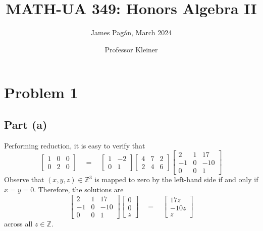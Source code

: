 \documentclass[11pt]{article}
\title{MATH-UA 349: Honors Algebra II}
\author{James Pagán, March 2024}
\date{Professor Kleiner}
\begin{document}
\maketitle
\tableofcontents
\newpage


\section{Problem 1}


\subsection{Part (a)}

Performing reduction, it is easy to verify that
\[
  \begin{bmatrix} 1 & 0 & 0 \\ 0 & 2 & 0 \end{bmatrix} \quad = \quad \begin{bmatrix} 1 & -2 \\ 0 & 1 \end{bmatrix} \begin{bmatrix} 4 & 7 & 2 \\ 2 & 4 & 6 \end{bmatrix} \begin{bmatrix} 2 & 1 & 17 \\ -1 & 0 & -10 \\ 0 & 0 & 1
\end{bmatrix}
\]
Observe that $(x, y, z) \in \mathbb{Z}^{3}$ is mapped to zero by the left-hand side if and only if $x = y = 0$. Therefore, the solutions are 
\[
  \begin{bmatrix} 2 & 1 & 17 \\ -1 & 0 & -10 \\ 0 & 0 & 1 \end{bmatrix} \begin{bmatrix} 0 \\ 0 \\ z \end{bmatrix} \quad = \quad \boxed{\begin{bmatrix} 17z \\ -10z \\ z \end{bmatrix}}
\]
across all $z \in \mathbb{Z}$.

\end{document}
